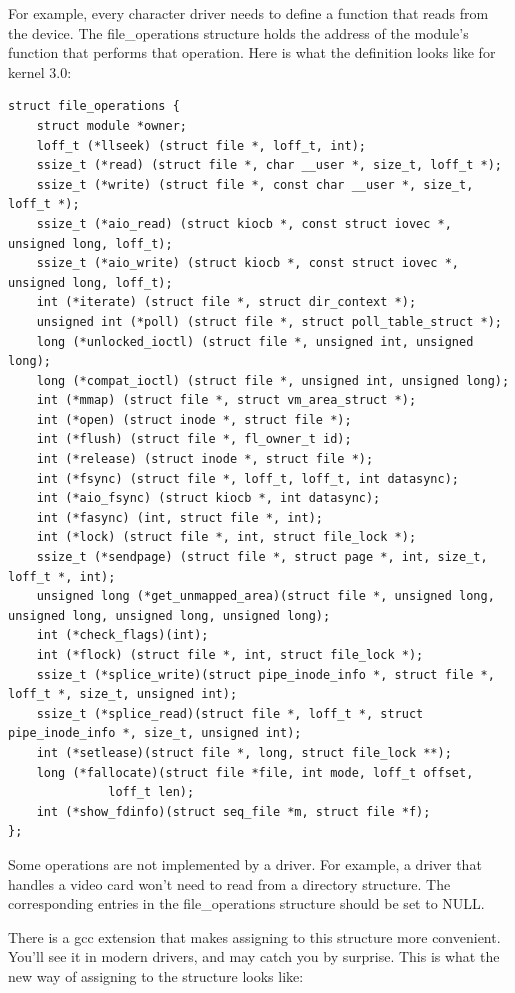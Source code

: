 \documentclass[11pt]{article}
\begin{document}
For example, every character driver needs to define a function that reads from the device. The file\_operations structure holds the address of the module's function that performs that operation. Here is what the definition looks like for kernel 3.0:

\begin{verbatim}
struct file_operations {
    struct module *owner;
    loff_t (*llseek) (struct file *, loff_t, int);
    ssize_t (*read) (struct file *, char __user *, size_t, loff_t *);
    ssize_t (*write) (struct file *, const char __user *, size_t, loff_t *);
    ssize_t (*aio_read) (struct kiocb *, const struct iovec *, unsigned long, loff_t);
    ssize_t (*aio_write) (struct kiocb *, const struct iovec *, unsigned long, loff_t);
    int (*iterate) (struct file *, struct dir_context *);
    unsigned int (*poll) (struct file *, struct poll_table_struct *);
    long (*unlocked_ioctl) (struct file *, unsigned int, unsigned long);
    long (*compat_ioctl) (struct file *, unsigned int, unsigned long);
    int (*mmap) (struct file *, struct vm_area_struct *);
    int (*open) (struct inode *, struct file *);
    int (*flush) (struct file *, fl_owner_t id);
    int (*release) (struct inode *, struct file *);
    int (*fsync) (struct file *, loff_t, loff_t, int datasync);
    int (*aio_fsync) (struct kiocb *, int datasync);
    int (*fasync) (int, struct file *, int);
    int (*lock) (struct file *, int, struct file_lock *);
    ssize_t (*sendpage) (struct file *, struct page *, int, size_t, loff_t *, int);
    unsigned long (*get_unmapped_area)(struct file *, unsigned long, unsigned long, unsigned long, unsigned long);
    int (*check_flags)(int);
    int (*flock) (struct file *, int, struct file_lock *);
    ssize_t (*splice_write)(struct pipe_inode_info *, struct file *, loff_t *, size_t, unsigned int);
    ssize_t (*splice_read)(struct file *, loff_t *, struct pipe_inode_info *, size_t, unsigned int);
    int (*setlease)(struct file *, long, struct file_lock **);
    long (*fallocate)(struct file *file, int mode, loff_t offset,
              loff_t len);
    int (*show_fdinfo)(struct seq_file *m, struct file *f);
};
\end{verbatim}

Some operations are not implemented by a driver. For example, a driver that handles a video card won't need to read from a directory structure. The corresponding entries in the file\_operations structure should be set to NULL.

There is a gcc extension that makes assigning to this structure more convenient. You'll see it in modern drivers, and may catch you by surprise. This is what the new way of assigning to the structure looks like:
\end{document}
